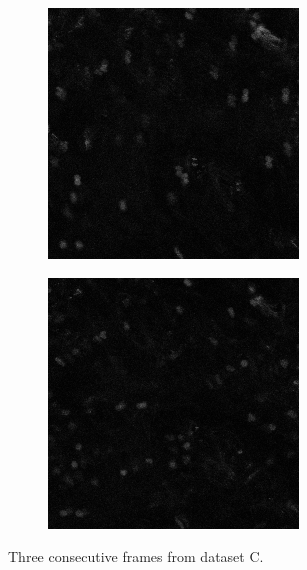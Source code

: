 \begin{figure}[h]
\begin{subfigure}{.32\textwidth}
	    	\includegraphics[width=\textwidth]{images/series13greencropped009}
    	\end{subfigure}
   		\hfill
  	    \begin{subfigure}{.32\textwidth}
   	  		\includegraphics[width=\textwidth]{images/series13greencropped010}
  	    \end{subfigure}
    	\caption{Three consecutive frames from dataset C.}
    	\label{fig:data_datasetC}
    \end{figure}
        

